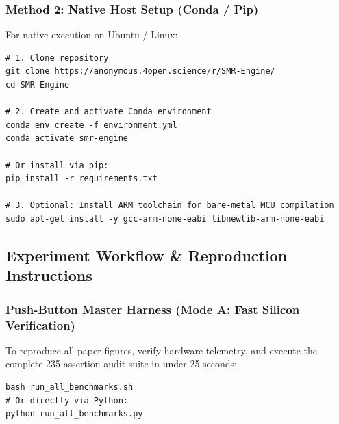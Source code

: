 \documentclass{article}
\begin{document}
\subsubsection{Method 2: Native Host Setup (Conda / Pip)}
For native execution on Ubuntu / Linux:
\begin{verbatim}
# 1. Clone repository
git clone https://anonymous.4open.science/r/SMR-Engine/
cd SMR-Engine

# 2. Create and activate Conda environment
conda env create -f environment.yml
conda activate smr-engine

# Or install via pip:
pip install -r requirements.txt

# 3. Optional: Install ARM toolchain for bare-metal MCU compilation
sudo apt-get install -y gcc-arm-none-eabi libnewlib-arm-none-eabi
\end{verbatim}

\subsection{Experiment Workflow \& Reproduction Instructions}

\subsubsection{Push-Button Master Harness (Mode A: Fast Silicon Verification)}
To reproduce all paper figures, verify hardware telemetry, and execute the complete 235-assertion audit suite in under 25 seconds:
\begin{verbatim}
bash run_all_benchmarks.sh
# Or directly via Python:
python run_all_benchmarks.py
\end{verbatim}
\end{document}

